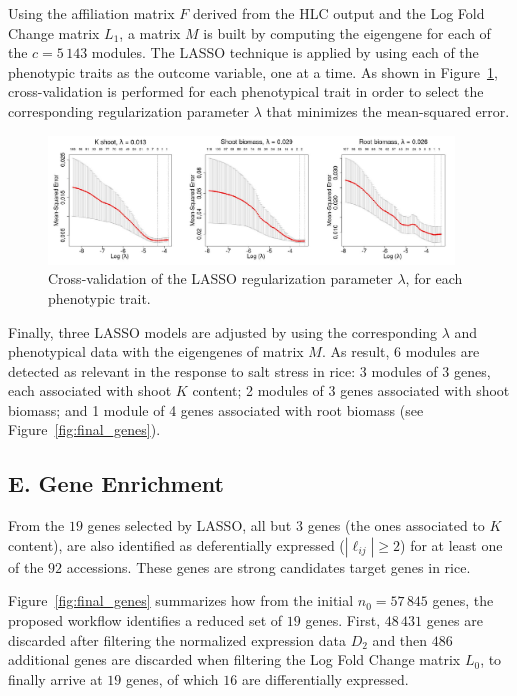 Using the affiliation matrix $F$ derived from the HLC output and the
Log Fold Change matrix $L_1$, a matrix $M$ is built by computing the
eigengene for each of the $c = 5\,143$ modules. The LASSO technique is
applied by using each of the phenotypic traits as the outcome
variable, one at a time. As shown in Figure~\ref{fig:cross-val},
cross-validation is performed for each phenotypical trait in order to
select the corresponding regularization parameter $\lambda$ that
minimizes the mean-squared error.
\vspace{0.5cm}

\begin{figure}[htbp]
  \centering
    \includegraphics[clip,width=0.96\textwidth]{figures/figure5.pdf}
  \caption{Cross-validation of the LASSO regularization parameter
    $\lambda$, for each phenotypic trait.}
  \label{fig:cross-val}
\end{figure}

Finally, three LASSO models are adjusted by using the corresponding
$\lambda$ and phenotypical data with the eigengenes of matrix $M$. As
result, 6 modules are detected as relevant in the response to salt
stress in rice: 3 modules of 3 genes, each associated with shoot $K$
content; 2 modules of 3 genes associated with shoot biomass; and 1
module of 4 genes associated with root biomass (see
Figure~\ref{fig:final_genes}).

\subsection*{E. Gene Enrichment}

From the $19$ genes selected by LASSO, all but $3$ genes (the ones
associated to $K$ content), are also identified as deferentially
expressed ($|\ell_{ij}| \geq 2$) for at least one of the $92$
accessions. These genes are strong 
candidates target genes in rice.
\vspace{0.5cm}

Figure~\ref{fig:final_genes} summarizes how from the initial
$n_0=57\,845$ genes, the proposed workflow identifies a reduced set of
$19$ genes. First, $48\,431$ genes are discarded after filtering the
normalized expression data $D_2$ and then $486$ additional genes are
discarded when filtering the Log Fold Change matrix $L_0$, to finally
arrive at $19$ genes, of which $16$ are differentially expressed.
\vspace{0.5cm}

